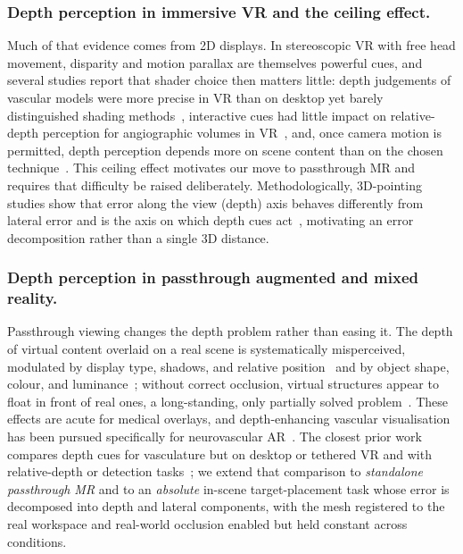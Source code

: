 \documentclass[runningheads]{llncs}
\begin{document}
\subsubsection{Depth perception in immersive VR and the ceiling effect.}
Much of that evidence comes from 2D displays. In stereoscopic VR with free head movement, disparity and motion parallax are themselves powerful cues, and several studies report that shader choice then matters little: depth judgements of vascular models were more precise in VR than on desktop yet barely distinguished shading methods~\cite{heinrich_estimating_2021}, interactive cues had little impact on relative-depth perception for angiographic volumes in VR~\cite{titov_effect_2021}, and, once camera motion is permitted, depth perception depends more on scene content than on the chosen technique~\cite{lesar_evaluation_2024}. This ceiling effect motivates our move to passthrough MR and requires that difficulty be raised deliberately. Methodologically, 3D-pointing studies show that error along the view (depth) axis behaves differently from lateral error and is the axis on which depth cues
act~\cite{teather_pointing_2011,batmaz_effect_2022}, motivating an error decomposition rather than a single 3D distance.

\subsubsection{Depth perception in passthrough augmented and mixed reality.}
Passthrough viewing changes the depth problem rather than easing it. The depth of virtual content overlaid on a real scene is systematically misperceived, modulated by display type, shadows, and relative position~\cite{adams_depth_2022} and by object shape, colour, and luminance~\cite{do_effects_2020}; without correct occlusion, virtual structures appear to float in front of real ones, a long-standing, only partially solved problem~\cite{macedo_occlusion_2023,shah_occlusion_2012}. These effects are acute for medical overlays, and depth-enhancing vascular visualisation has been pursued specifically for neurovascular AR~\cite{kersten-oertel_volume_2013,kersten-oertel_augmented_2015}. The closest prior work compares depth cues for vasculature but on desktop or tethered VR and with relative-depth or detection tasks~\cite{kersten-oertel_evaluation_2014,titov_effect_2021}; we extend that comparison to \emph{standalone passthrough MR} and to an \emph{absolute} in-scene target-placement task whose error is decomposed into depth and lateral components, with the mesh registered to the real workspace and real-world occlusion enabled but held constant across conditions.
\end{document}
